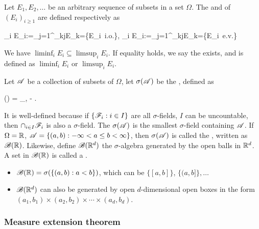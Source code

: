 \documentclass[10pt,a4paper]{article}
\begin{document}
\begin{defbox}
	\begin{definition}\label{def:liminfsup}
		Let $E_1,E_2,\ldots$ be an arbitrary sequence of subsets in a set $\Omega$. The  and  of $(E_i)_{i\geq 1}$ are defined respectively as 
		\begin{sequation*}
			\liminf_i E_i:=\bigcup_{j=1}^\infty\bigcap_{k\geq j}E_k=\{E_i\ i.o.\}, \qquad \limsup_i E_i:=\bigcap_{j=1}^\infty\bigcup_{k\geq j}E_k=\{E_i\ e.v.\}
		\end{sequation*}
	\end{definition}
\end{defbox}
We have $\liminf_i E_i \subseteq \limsup_i E_i$. If equality holds, we say the  exists, and is defined as $\liminf_i E_i$ or $\limsup_i E_i$.    

\begin{defbox}
	\begin{definition}\label{def:generated-sigma-field}
		Let $\mathscr{A}$ be a collection of subsets of $\Omega$,  let $\sigma(\mathscr{A})$ be the , defined as 
		\begin{sequation*}
			\sigma(\scrA) = \bigcap_{\scrA\subseteq\scrF, \scrF \sigma-} \scrF.
		\end{sequation*}   
	\end{definition}
\end{defbox}
It is well-defined because if $\{\mathscr{F}_i:i\in I\}$ are all $\sigma$-fields, $I$ can be uncountable, then $\cap_{i\in I}\mathscr{F}_i$ is also a $\sigma$-field. The $\sigma(\mathscr{A})$ is the smallest $\sigma$-field containing $\mathscr{A}$. If $\Omega=\mathbb R$, $\mathscr{A}=\{(a,b):-\infty <a\leq b< \infty  \}$, then $\sigma(\mathscr{A})$ is called the , written as $\mathscr{B}(\mathbb R)$. Likewise, define $\mathscr{B}(\mathbb R^d)$ the $\sigma$-algebra generated by the open balls in $\mathbb R^d$. A set in $\mathscr{B}(\mathbb R)$ is called a . 
\begin{itemize}
	\item $\mathscr{B}(\mathbb R)=\sigma(\{(a,b):a<b\})$, which can be $\{[a,b]\}$, $\{(a,b]\}, \ldots$
	\item $\mathscr{B}(\mathbb R^d)$ can also be generated by open $d$-dimensional open boxes in the form $(a_1,b_1)\times(a_2,b_2)\times\cdots\times(a_d,b_d)$.   
\end{itemize}   

\subsubsection{Measure extension theorem}\label{sec:mea-extension}
\end{document}

